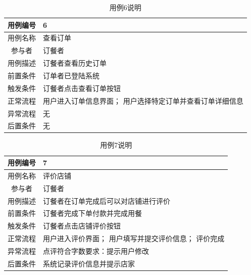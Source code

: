 \documentclass{article}
\begin{document}
    \begin{table}[H]
        \centering
        \caption{用例6说明}
        \begin{tabular}{cm{12cm}}
            \hline
            用例编号 & 6 \\
            \hline
            用例名称 & 查看订单 \\
            \hline
            参与者 & 订餐者 \\
            \hline
            用例描述 & 订餐者查看历史订单 \\
            \hline
            前置条件 & 订单者已登陆系统 \\
            \hline
            触发条件 & 订餐者点击查看订单按钮 \\
            \hline
            正常流程 & 用户进入订单信息界面； 用户选择特定订单并查看订单详细信息 \\
            \hline
            异常流程 & 无 \\
            \hline
            后置条件 & 无 \\
            \hline
        \end{tabular}
    \end{table}
    \begin{table}[H]
        \centering
        \caption{用例7说明}
        \begin{tabular}{cm{12cm}}
            \hline
            用例编号 & 7 \\
            \hline
            用例名称 & 评价店铺 \\
            \hline
            参与者 & 订餐者 \\
            \hline
            用例描述 & 订餐者在订单完成后可以对店铺进行评价 \\
            \hline
            前置条件 & 订餐者完成下单付款并完成用餐 \\
            \hline
            触发条件 & 订餐者点击店铺评价按钮 \\
            \hline
            正常流程 & 用户进入评价界面； 用户填写并提交评价信息； 评价完成 \\
            \hline
            异常流程 & 点评符合字数要求：提示用户修改 \\
            \hline
            后置条件 & 系统记录评价信息并提示店家 \\
            \hline
        \end{tabular}
    \end{table}
\end{document}
